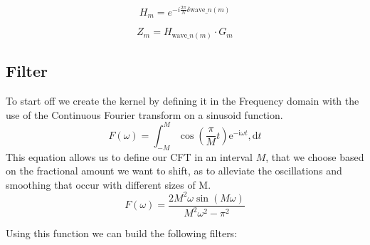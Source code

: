\documentclass[]{usiinfbachelorproject}
\begin{document}
	\begin{equation*}
		H_m = e^{-i \frac{2\pi}{N}  \delta \text{wave}\_n(m)}
	\end{equation*}
	
	\begin{equation}\label{phase_shift_equation}
		Z_m = H_{\text{wave}\_n(m)} \cdot G_m
	\end{equation}	
	
	
	
	\subsection{Filter}
	To start off we create the kernel by defining it in the Frequency domain with the use of the Continuous Fourier transform on a sinusoid function.
	\begin{equation}
		F(\omega) = \int_{-M}^{M} \cos(\frac{\pi}{M}t)\mathrm{e}^{-\mathrm{i}\omega t},\mathrm{d}t
	\end{equation}
	This equation allows us to define our CFT in an interval $M$, that we choose based on the fractional amount we want to shift, as to alleviate the oscillations and smoothing that occur with different sizes of M.
	\begin{equation}\label{filter_formula}
		F(\omega) = \frac{2M^2\omega \sin(M\omega)}{M^2\omega^2-\pi^2}
	\end{equation}
	
	Using this function we can build the following filters:
	
\end{document}
